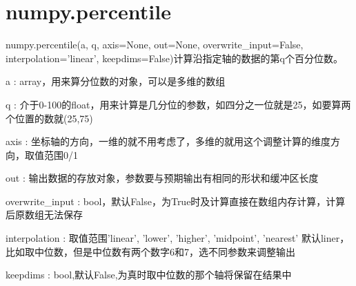 \documentclass[11pt]{article}
\begin{document}
\section{numpy.percentile}
numpy.percentile(a, q, axis=None, out=None, overwrite\_input=False, interpolation='linear', keepdims=False)计算沿指定轴的数据的第q个百分位数。

a : array，用来算分位数的对象，可以是多维的数组

q : 介于0-100的float，用来计算是几分位的参数，如四分之一位就是25，如要算两个位置的数就(25,75)

axis : 坐标轴的方向，一维的就不用考虑了，多维的就用这个调整计算的维度方向，取值范围0/1

out : 输出数据的存放对象，参数要与预期输出有相同的形状和缓冲区长度

overwrite\_input : bool，默认False，为True时及计算直接在数组内存计算，计算后原数组无法保存

interpolation : 取值范围{'linear', 'lower', 'higher', 'midpoint', 'nearest'}
默认liner，比如取中位数，但是中位数有两个数字6和7，选不同参数来调整输出

keepdims : bool,默认False,为真时取中位数的那个轴将保留在结果中
\end{document}
